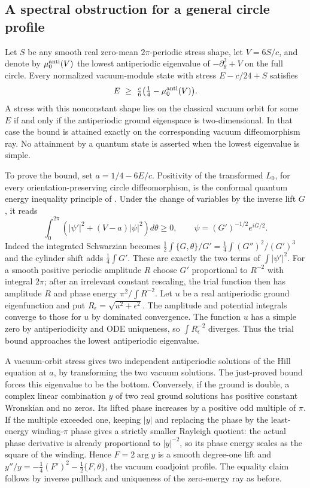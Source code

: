 \documentclass[11pt]{article}
\begin{document}
\subsection{A spectral obstruction for a general circle profile}
Let \(S\) be any smooth real zero-mean \(2\pi\)-periodic stress shape, let \(V=6S/c\), and denote by \(\mu_0^{\rm anti}(V)\) the lowest antiperiodic eigenvalue of \(-\partial_\theta^2+V\) on the full circle. Every normalized vacuum-module state with stress \(E-c/24+S\) satisfies
\[
 E\ \ge\ \tfrac c6\bigl(\tfrac14-\mu_0^{\rm anti}(V)\bigr).
\]
A stress with this nonconstant shape lies on the classical vacuum orbit for some \(E\) if and only if the antiperiodic ground eigenspace is two-dimensional. In that case the bound is attained exactly on the corresponding vacuum diffeomorphism ray. No attainment by a quantum state is asserted when the lowest eigenvalue is simple.

To prove the bound, set \(a=1/4-6E/c\). Positivity of the transformed \(L_0\), for every orientation-preserving circle diffeomorphism, is the conformal quantum energy inequality principle of \cite{fewster}. Under the change of variables by the inverse lift \(G\), it reads
\[
 \int_0^{2\pi}\left(|\psi'|^2+(V-a)|\psi|^2\right)d\theta\ge0,
 \qquad \psi=(G')^{-1/2}e^{iG/2}.
\]
Indeed the integrated Schwarzian becomes
\(\frac12\int \{G,\theta\}/G'=\frac14\int (G'')^2/(G')^3\)
and the cylinder shift adds \(\frac14\int G'\). These are exactly the two terms of \(\int|\psi'|^2\). For a smooth positive periodic amplitude \(R\) choose \(G'\) proportional to \(R^{-2}\) with integral \(2\pi\); after an irrelevant constant rescaling, the trial function then has amplitude \(R\) and phase energy \(\pi^2/\int R^{-2}\). Let \(u\) be a real antiperiodic ground eigenfunction and put \(R_\epsilon=\sqrt{u^2+\epsilon^2}\). The amplitude and potential integrals converge to those for \(u\) by dominated convergence. The function \(u\) has a simple zero by antiperiodicity and ODE uniqueness, so \(\int R_\epsilon^{-2}\) diverges. Thus the trial bound approaches the lowest antiperiodic eigenvalue.

A vacuum-orbit stress gives two independent antiperiodic solutions of the Hill equation at \(a\), by transforming the two vacuum solutions. The just-proved bound forces this eigenvalue to be the bottom. Conversely, if the ground is double, a complex linear combination \(y\) of two real ground solutions has positive constant Wronskian and no zeros. Its lifted phase increases by a positive odd multiple of \(\pi\). If the multiple exceeded one, keeping \(|y|\) and replacing the phase by the least-energy winding-\(\pi\) phase gives a strictly smaller Rayleigh quotient: the actual phase derivative is already proportional to \(|y|^{-2}\), so its phase energy scales as the square of the winding. Hence \(F=2\arg y\) is a smooth degree-one lift and \(y''/y=-\frac14(F')^2-\frac12\{F,\theta\}\), the vacuum coadjoint profile. The equality claim follows by inverse pullback and uniqueness of the zero-energy ray as before.
\end{document}
